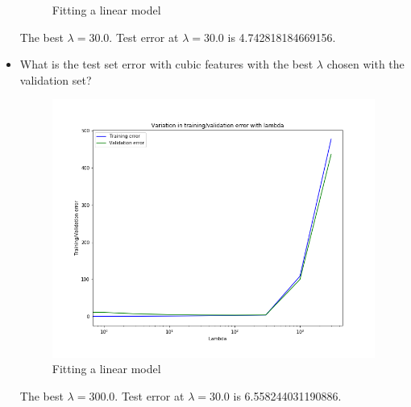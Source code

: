 \documentclass{article}
\begin{document}
\begin{itemize}
\begin{figure}[htbp]
	\caption{Fitting a linear model}
\end{figure}
The best $\lambda = 30.0$. Test error at $\lambda = 30.0$ is 4.742818184669156.
\pagebreak
\item What is the test set error with cubic features with the best $\lambda$ chosen with the validation set?\\
\begin{figure}[htbp]
	\centering
	\includegraphics[scale = 0.4]{ex_select_lambda_poly2.png}
	\caption{Fitting a linear model}
\end{figure}
The best $\lambda = 300.0$. Test error at $\lambda = 30.0$ is 6.558244031190886.
\end{itemize}
\end{document}
